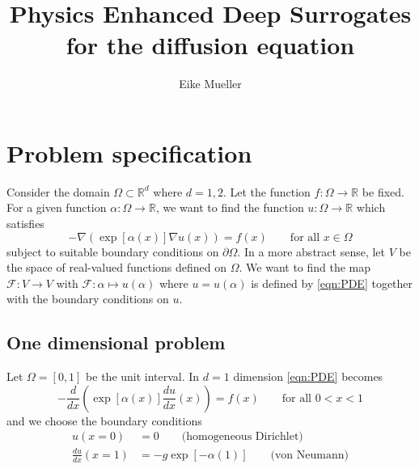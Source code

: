 \documentclass[11pt]{article}
\title{Physics Enhanced Deep Surrogates for the diffusion equation}
\author{Eike Mueller}
\begin{document}
\maketitle
\section{Problem specification}
Consider the domain $\Omega\subset \mathbb{R}^{d}$ where $d=1,2$. Let the function $f:\Omega\rightarrow \mathbb{R}$ be fixed. For a given function $\alpha:\Omega\rightarrow \mathbb{R}$, we want to find the function $u:\Omega\rightarrow\mathbb{R}$ which satisfies
\begin{equation}
        -\nabla\left(\exp[\alpha(x)]\nabla u(x)\right) = f(x)\qquad\text{for all $x\in \Omega$}
        \label{eqn:PDE}
\end{equation}
subject to suitable boundary conditions on $\partial\Omega$.
In a more abstract sense, let $V$ be the space of real-valued functions defined on $\Omega$. We want to find the map $\mathcal{F} : V\rightarrow V$ with $\mathcal{F}:\alpha \mapsto u(\alpha)$ where $u=u(\alpha)$ is defined by \eqref{eqn:PDE} together with the boundary conditions on $u$.
\subsection{One dimensional problem}
Let $\Omega=[0,1]$ be the unit interval. In $d=1$ dimension \eqref{eqn:PDE} becomes
\begin{equation}
    -\frac{d}{dx}\left(\exp[\alpha(x)]\frac{du}{dx}(x)\right) = f(x)\qquad\text{for all $0<x<1$}
    \label{eqn:PDE_1d}
\end{equation}
and we choose the boundary conditions 
\begin{equation}
    \begin{aligned}
    u(x=0) &=0 \qquad{\text{(homogeneous Dirichlet)}}\\
    \frac{du}{dx}(x=1) &=-g\exp[-\alpha(1)] \qquad{\text{(von Neumann)}}
    \end{aligned}
    \label{eqn:boundary_condition_1d}
\end{equation}
\end{document}
